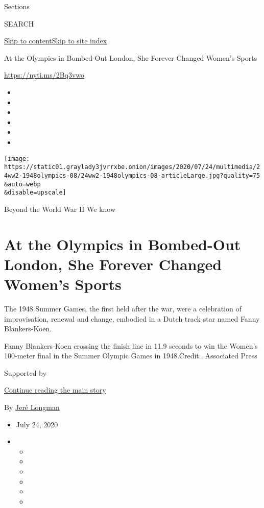 Sections

SEARCH

\protect\hyperlink{site-content}{Skip to
content}\protect\hyperlink{site-index}{Skip to site index}

At the Olympics in Bombed-Out London, She Forever Changed Women's Sports

\url{https://nyti.ms/2Bq3vwo}

\begin{itemize}
\item
\item
\item
\item
\item
\item
\end{itemize}

\texttt{[image: https://static01.graylady3jvrrxbe.onion/images/2020/07/24/multimedia/24ww2-1948olympics-08/24ww2-1948olympics-08-articleLarge.jpg?quality=75\\\&auto=webp\\\&disable=upscale]}

Beyond the World War II We know

\hypertarget{at-the-olympics-in-bombed-out-london-she-forever-changed-womens-sports}{%
\section{At the Olympics in Bombed-Out London, She Forever Changed
Women's
Sports}\label{at-the-olympics-in-bombed-out-london-she-forever-changed-womens-sports}}

The 1948 Summer Games, the first held after the war, were a celebration
of improvisation, renewal and change, embodied in a Dutch track star
named Fanny Blankers-Koen.

Fanny Blankers-Koen crossing the finish line in 11.9 seconds to win the
Women's 100-meter final in the Summer Olympic Games in
1948.Credit...Associated Press

Supported by

\protect\hyperlink{after-sponsor}{Continue reading the main story}

By \href{https://www.nytimes3xbfgragh.onion/by/jere-longman}{Jeré
Longman}

\begin{itemize}
\item
  July 24, 2020
\item
  \begin{itemize}
  \item
  \item
  \item
  \item
  \item
  \item
  \end{itemize}
\end{itemize}

